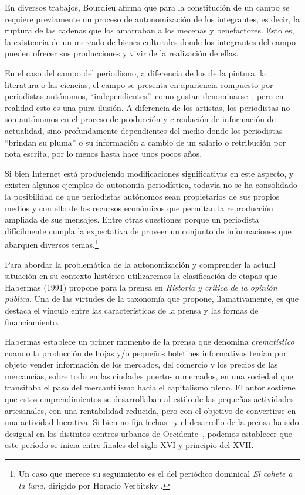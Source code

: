 En diversos trabajos, Bourdieu afirma que para la constitución de un campo se requiere previamente un proceso de autonomización de los integrantes, es decir, la ruptura de las cadenas que los amarraban a los mecenas y benefactores. Esto es, la existencia de un mercado de bienes culturales donde los integrantes del campo pueden ofrecer sus producciones y vivir de la realización de ellas.

En el caso del campo del periodismo, a diferencia de los de la pintura, la literatura o las ciencias, el campo se presenta en apariencia compuesto por periodistas autónomos, ``independientes''--como gustan denominarse--, pero en realidad esto es una pura ilusión. A diferencia de los artistas, los periodistas no son autónomos en el proceso de producción y circulación de información de actualidad, sino profundamente dependientes del medio donde los periodistas ``brindan su pluma'' o su información a cambio de un salario o retribución por nota escrita, por lo menos hasta hace unos pocos años.

Si bien Internet está produciendo modificaciones significativas en este aspecto, y existen algunos ejemplos de autonomía periodística, todavía no se ha consolidado la posibilidad de que periodistas autónomos sean propietarios de sus propios medios y con ello de los recursos económicos que permitan la reproducción ampliada de sus mensajes. Entre otras cuestiones porque un periodista difícilmente cumpla la expectativa de proveer un conjunto de informaciones que abarquen diversos temas.\footnote{Un caso que merece su seguimiento es el del periódico dominical \emph{El cohete a la luna}, dirigido por Horacio Verbitsky .}

Para abordar la problemática de la autonomización y comprender la actual situación en su contexto histórico utilizaremos la clasificación de etapas que Habermas (1991) propone para la prensa en \emph{Historia y crítica de la opinión pública}. Una de las virtudes de la taxonomía que propone, llamativamente, es que destaca el vínculo entre las características de la prensa y las formas de financiamiento.

Habermas establece un primer momento de la prensa que denomina \emph{crematístico} cuando la producción de hojas y/o pequeños boletines informativos tenían por objeto vender información de los mercados, del comercio y los precios de las mercancías, sobre todo en las ciudades puertos o mercados, en una sociedad que transitaba el paso del mercantilismo hacia el capitalismo pleno. El autor sostiene que estos emprendimientos se desarrollaban al estilo de las pequeñas actividades artesanales, con una rentabilidad reducida, pero con el objetivo de convertirse en una actividad lucrativa. Si bien no fija fechas --y el desarrollo de la prensa ha sido desigual en los distintos centros urbanos de Occidente--, podemos establecer que este período se inicia entre finales del siglo XVI y principio del XVII.

